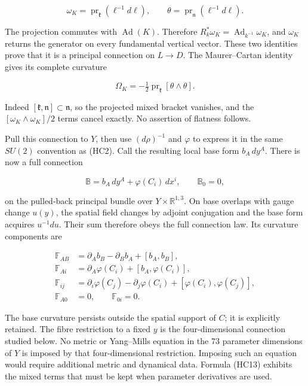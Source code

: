 \documentclass[11pt]{article}
\begin{document}
\[
 \omega_K=\operatorname{pr}_{\mathfrak k}(\ell^{-1}d\ell),\qquad
 \theta=\operatorname{pr}_{\mathfrak n}(\ell^{-1}d\ell).
 \tag{HC10}
\]

The projection commutes with \(\operatorname{Ad}(K)\). Therefore
\(R_k^*\omega_K=\operatorname{Ad}_{k^{-1}}\omega_K\), and \(\omega_K\)
returns the generator on every fundamental vertical vector. These two
identities prove that it is a principal connection on \(L\to D\).
The Maurer–Cartan identity gives its complete curvature

\[
 \Omega_K=-\tfrac12\operatorname{pr}_{\mathfrak k}[\theta\wedge\theta].
 \tag{HC11}
\]

Indeed \([\mathfrak k,\mathfrak n]\subset\mathfrak n\), so the projected
mixed bracket vanishes, and the \([\omega_K\wedge\omega_K]/2\) terms
cancel exactly. No assertion of flatness follows.

Pull this connection to \(Y\), then use \((d\rho)^{-1}\) and \(\varphi\)
to express it in the same \(SU(2)\) convention as (HC2). Call the resulting
local base form \(b_A\,dy^A\). There is now a full connection

\[
 \mathbb B=b_A\,dy^A+\varphi(C_i)\,dx^i,
 \qquad \mathbb B_0=0,
 \tag{HC12}
\]

on the pulled-back principal bundle over \(Y\times\mathbb R^{1,3}\).
On base overlaps with gauge change \(u(y)\), the spatial field changes by
adjoint conjugation and the base form acquires \(u^{-1}du\). Their sum
therefore obeys the full connection law. Its curvature components are

\[
 \begin{aligned}
 \mathbb F_{AB}&=\partial_A b_B-\partial_B b_A+[b_A,b_B],\\
 \mathbb F_{Ai}&=\partial_A\varphi(C_i)+[b_A,\varphi(C_i)],\\
 \mathbb F_{ij}&=\partial_i\varphi(C_j)-\partial_j\varphi(C_i)
                       +[\varphi(C_i),\varphi(C_j)],\\
 \mathbb F_{A0}&=0,\qquad\mathbb F_{0i}=0.
 \end{aligned}\tag{HC13}
\]

The base curvature persists outside the spatial support of \(C\); it is
explicitly retained. The fibre restriction to a fixed \(y\) is the
four-dimensional connection studied below. No metric or Yang–Mills
equation in the 73 parameter dimensions of \(Y\) is imposed by that
four-dimensional restriction. Imposing such an equation would require
additional metric and dynamical data. Formula (HC13) exhibits the mixed
terms that must be kept when parameter derivatives are used.
\end{document}
